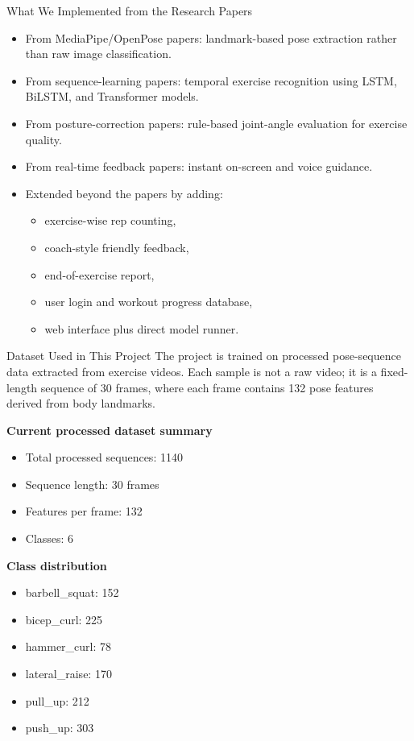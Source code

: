 \documentclass[aspectratio=169]{beamer}
\begin{document}
\begin{frame}{What We Implemented from the Research Papers}
\begin{itemize}
  \item From MediaPipe/OpenPose papers: landmark-based pose extraction rather than raw image classification.
  \item From sequence-learning papers: temporal exercise recognition using LSTM, BiLSTM, and Transformer models.
  \item From posture-correction papers: rule-based joint-angle evaluation for exercise quality.
  \item From real-time feedback papers: instant on-screen and voice guidance.
  \item Extended beyond the papers by adding:
  \begin{itemize}
    \item exercise-wise rep counting,
    \item coach-style friendly feedback,
    \item end-of-exercise report,
    \item user login and workout progress database,
    \item web interface plus direct model runner.
  \end{itemize}
\end{itemize}
\end{frame}

\begin{frame}{Dataset Used in This Project}
\justifying
The project is trained on processed pose-sequence data extracted from exercise videos. Each sample is not a raw video; it is a fixed-length sequence of 30 frames, where each frame contains 132 pose features derived from body landmarks.

\vspace{0.3cm}
\textbf{Current processed dataset summary}
\begin{itemize}
  \item Total processed sequences: 1140
  \item Sequence length: 30 frames
  \item Features per frame: 132
  \item Classes: 6
\end{itemize}

\vspace{0.2cm}
\textbf{Class distribution}
\begin{itemize}
  \item barbell\_squat: 152
  \item bicep\_curl: 225
  \item hammer\_curl: 78
  \item lateral\_raise: 170
  \item pull\_up: 212
  \item push\_up: 303
\end{itemize}
\end{frame}
\end{document}
